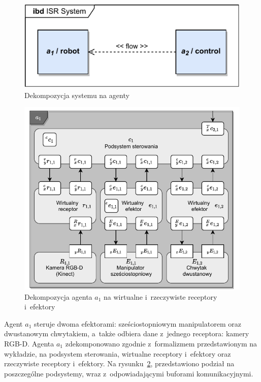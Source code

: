 \begin{figure}[b]
    \centering
    \includegraphics[width=\columnwidth]{figures/ISR-agents.pdf}
    \caption{Dekompozycja systemu na agenty}
    \label{fig:agenty-system}
\end{figure}

\begin{figure}[t]
    \centering
    \includegraphics[width=\columnwidth]{figures/ISR-agent-decomposition.pdf}
    \caption{Dekompozycja agenta $a_{1}$ na wirtualne i~rzeczywiste receptory i~efektory}
    \label{fig:dekompozycja-agent-1}
\end{figure}

Agent $a_{1}$ steruje dwoma efektorami: sześciostopniowym manipulatorem oraz dwustanowym chwytakiem, a~także odbiera dane z~jednego receptora: kamery RGB-D. Agenta $a_{1}$ zdekomponowano zgodnie z~formalizmem przedstawionym na wykładzie, na podsystem sterowania, wirtualne receptory i~efektory oraz rzeczywiste receptory i~efektory. Na rysunku~\ref{fig:dekompozycja-agent-1}, przedstawiono podział na poszczególne podsystemy, wraz z~odpowiadającymi buforami komunikacyjnymi.
